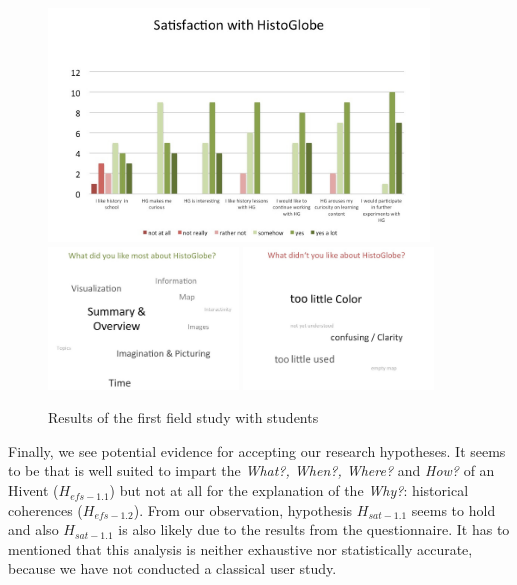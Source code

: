 \begin{figure}[ht]
  \begin{center}
    \includegraphics[width=0.9\textwidth]{graphics/test-1-satisfaction.jpg} \\[0.5em]
    \includegraphics[width=0.45\textwidth]{graphics/test-1-tagcloud-pos.jpg}
    \includegraphics[width=0.45\textwidth]{graphics/test-1-tagcloud-neg.jpg}
  \end{center}
  \caption{Results of the first field study with students}
  \label{fig:studyresults-1}
\end{figure}

Finally, we see potential evidence for accepting our research hypotheses. It seems to be that \HG is well suited to impart the \textit{What?, When?, Where?} and \textit{How?} of an Hivent ($H_{efs-1.1}$) but not at all for the explanation of the \textit{Why?}: historical coherences ($H_{efs-1.2}$). From our observation, hypothesis $H_{sat-1.1}$ seems to hold and also $H_{sat-1.1}$ is also likely due to the results from the questionnaire. It has to mentioned that this analysis is neither exhaustive nor statistically accurate, because we have not conducted a classical user study.

